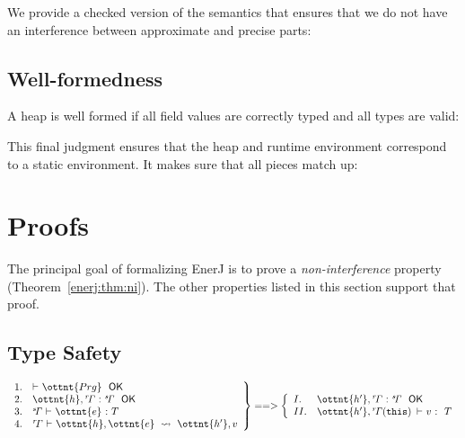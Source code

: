 We provide a checked version of the semantics that ensures that we do
not have an interference between approximate and precise parts:

\vspace{0.5ex}
\ottdefncheckedsemantics{}
\vspace{2.0ex}


\subsection{Well-formedness}

A heap is well formed if all field values are correctly typed and all
types are valid:

\vspace{0.5ex}
\ottdefnwfheap{}
\vspace{2.0ex}


This final judgment ensures that the heap and runtime environment
correspond to a static environment.
It makes sure that all pieces match up:

\vspace{0.5ex}
\ottdefnwfenvs{}
\vspace{2.0ex}



\section{Proofs}
\label{enerj:proofs}

The principal goal of formalizing EnerJ is to prove a \emph{non-interference}
property (Theorem~\ref{enerj:thm:ni}). The other properties listed in this section
support that proof.


\subsection{Type Safety}

\begin{theorem}
\label{enerj:thm:ts}
\[
\left.
\begin{array}{ll}
1. &  \textsf{$\vdash$} \  \ottnt{Prg} \ \  \textsf{OK} \\
2. &  \ottnt{h} ,  \mathit{ {^r}\!\Gamma} \  \textsf{:} \  \mathit{ {^s}\!\Gamma} \ \  \textsf{OK} \\
3. &  \mathit{ {^s}\!\Gamma} \  \textsf{$\vdash$} \  \ottnt{e} \  \textsf{:} \  T \\
4. &  \mathit{ {^r}\!\Gamma} \  \textsf{$\vdash$} \  \ottnt{h} ,  \ottnt{e} \ \leadsto\  \ottnt{h'} ,  v \\
\end{array}
\right\} ==> \left\{
\begin{array}{ll}
I.  &  \ottnt{h'} ,  \mathit{ {^r}\!\Gamma} \  \textsf{:} \  \mathit{ {^s}\!\Gamma} \ \  \textsf{OK} \\
II. &  \ottnt{h'} ,   \mathit{ {^r}\!\Gamma} \!\left( \texttt{\upshape{this}\,\!} \right)  \  \textsf{$\vdash$} \  v \  \textsf{:} \ \  T \\
\end{array}
\right.
\]
\end{theorem}


